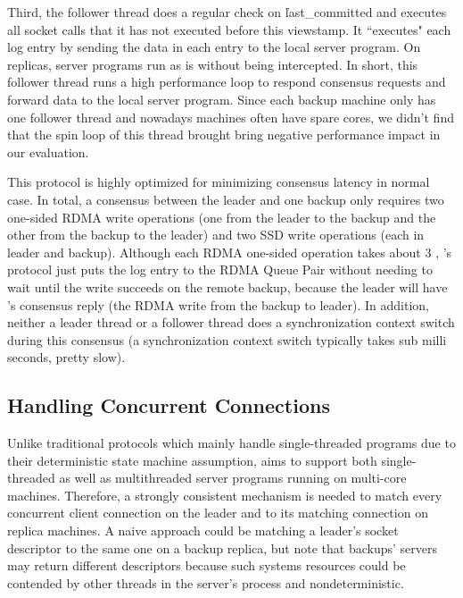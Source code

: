 Third, the follower thread does a regular \paxos check on \v{last\_committed} 
and executes all socket calls that it has not executed before this viewstamp. 
It ``executes" each log entry by sending the data in each entry to the local 
server program. On replicas, server programs run as is without being 
intercepted. In short, this follower thread runs a high performance loop to 
respond consensus requests and forward data to the local server program. Since 
each backup machine only has one follower thread and nowadays machines often 
have spare cores, we didn't find that the spin loop of this thread brought 
bring negative performance impact in our evaluation.

This protocol is highly optimized for minimizing consensus latency in normal 
case. In total, a consensus between the leader and one backup only requires 
two one-sided RDMA write operations (one from the leader to the backup and the 
other from the backup to the leader) and two SSD write operations (each in 
leader and backup). Although each RDMA one-sided operation takes about 3 \us, 
\xxx's protocol just puts the log entry to the RDMA Queue Pair without needing 
to wait until the write succeeds on the remote backup, because the leader will 
have \paxos's consensus reply (the RDMA write from the backup to leader). In 
addition, neither a leader thread or a follower thread does a synchronization 
context switch during this consensus (a synchronization context switch 
typically takes sub milli seconds, pretty slow).



\subsection{Handling Concurrent Connections} \label{sec:concurrent}

Unlike traditional \paxos protocols which mainly handle single-threaded 
programs due to their deterministic state machine assumption, \xxx aims to 
support both single-threaded as well as multithreaded server programs running 
on multi-core machines. Therefore, a strongly consistent mechanism is needed to 
match every concurrent client connection on the leader and to its matching 
connection on replica machines. A naive approach could be matching a leader's 
socket descriptor to the same one on a backup replica, but note that backups' 
servers may return different descriptors because such systems resources could 
be contended by other threads in the server's process and nondeterministic.

